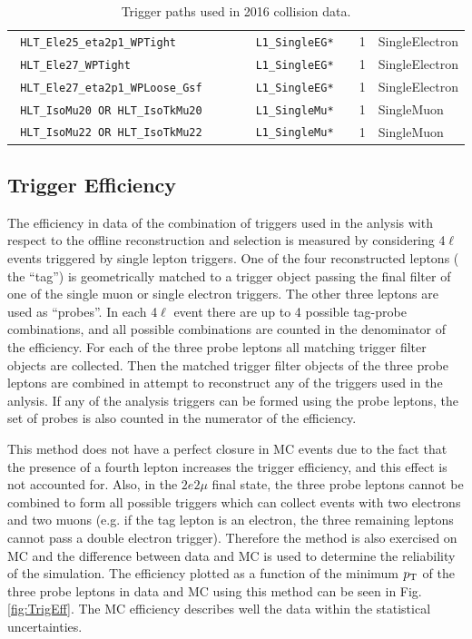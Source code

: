 \begin{table}[h]
\begin{tabular}{|l|l|c|l|}
\verb| HLT_Ele25_eta2p1_WPTight                        | & \verb| L1_SingleEG*         |  & 1 & SingleElectron \\
\verb| HLT_Ele27_WPTight                               | & \verb| L1_SingleEG*         |  & 1 & SingleElectron \\
\verb| HLT_Ele27_eta2p1_WPLoose_Gsf                    | & \verb| L1_SingleEG*         |  & 1 & SingleElectron \\
\verb| HLT_IsoMu20 OR HLT_IsoTkMu20                    | & \verb| L1_SingleMu*         |  & 1 & SingleMuon \\
\verb| HLT_IsoMu22 OR HLT_IsoTkMu22                    | & \verb| L1_SingleMu*         |  & 1 & SingleMuon \\
\hline %
    \end{tabular}
    \caption{Trigger paths used in 2016 collision data.}
    \label{tab:triggerPaths}
\end{table}


\subsection{Trigger Efficiency}

The efficiency in data of the combination of triggers used in the anlysis with respect to the offline reconstruction and selection is measured
by considering 4$\ell$ events triggered by single lepton triggers. One of the four reconstructed leptons ( the ``tag'') is geometrically matched 
to a trigger object passing the final filter of one of the single muon or single electron triggers. The other three leptons are 
used as ``probes''. In each 4$\ell$ event there are up to 4 possible tag-probe combinations, and all possible combinations are counted in the
denominator of the efficiency. For each of the three probe leptons all matching trigger filter objects are collected. Then the matched trigger filter
objects of the three probe leptons are combined in attempt to reconstruct any of the triggers used in the anlysis. If any of the analysis triggers
can be formed using the probe leptons, the set of probes is also counted in the numerator of the efficiency.

This method does not have a perfect closure in MC events due to the fact that the presence of a fourth lepton increases the trigger efficiency,
and this effect is not accounted for. Also, in the  $2e2\mu$ final state, the three probe leptons cannot be combined to form all possible triggers which 
can collect events with two electrons and two muons (e.g. if the tag lepton is an electron, the three remaining leptons cannot pass a double electron
trigger). Therefore the method is also exercised on MC and the difference between data and MC is used to determine the reliability of the simulation.
 The efficiency plotted as a function of the minimum $p_{\rm{T}}$ of the three probe leptons in data and MC using this method can be seen in 
Fig.\ref{fig:TrigEff}. The MC efficiency describes well the data within the statistical uncertainties.

